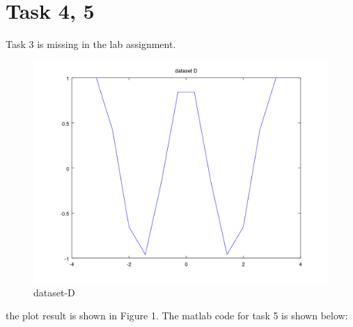 \documentclass[11pt]{article}
\theoremstyle{plain}
\theoremstyle{definition}
\begin{document}
\section{Task 4, 5} 
Task 3 is missing in the lab assignment.\newline 
\begin{figure}
  \centering 
  \includegraphics[width=.5\linewidth]{task4_hw1.png}
  \caption{dataset-D}
  \label{fig:dataset-D}
\end{figure}
the plot result is shown in Figure 1.
The matlab code for task 5 is shown below: 

\end{document}

